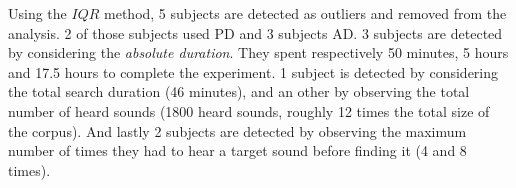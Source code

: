 \documentclass{aes2e}
\begin{document}

Using the $IQR$ method, 5 subjects are detected as outliers and removed from the analysis. 2 of those subjects used PD and 3 subjects AD. %
3 subjects are detected by considering the \textit{absolute duration}. They spent respectively 50 minutes, 5 hours and 17.5 hours to complete the experiment. 1 subject is detected by considering the total search duration (46 minutes), and an other by observing the total number of heard sounds (1800 heard sounds, roughly 12 times the total size of the corpus). And lastly 2 subjects are detected by observing the maximum number of times they had to hear a target sound before finding it (4 and 8 times).
\end{document}
